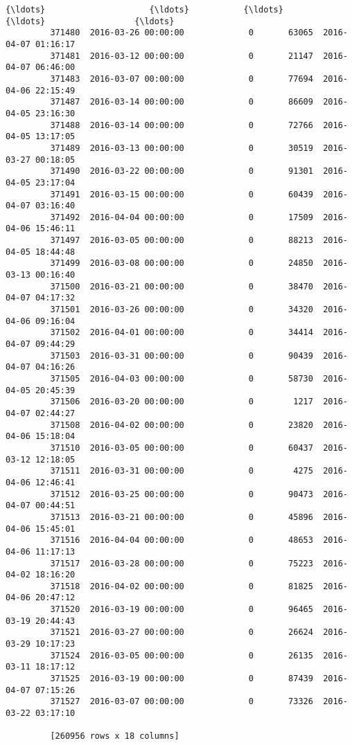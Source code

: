 \documentclass[11pt]{article}
\begin{document}
\begin{Verbatim}[commandchars=\\\{\}]
         {\ldots}                     {\ldots}           {\ldots}         {\ldots}                  {\ldots}  
         371480  2016-03-26 00:00:00             0       63065  2016-04-07 01:16:17  
         371481  2016-03-12 00:00:00             0       21147  2016-04-07 06:46:00  
         371483  2016-03-07 00:00:00             0       77694  2016-04-06 22:15:49  
         371487  2016-03-14 00:00:00             0       86609  2016-04-05 23:16:30  
         371488  2016-03-14 00:00:00             0       72766  2016-04-05 13:17:05  
         371489  2016-03-13 00:00:00             0       30519  2016-03-27 00:18:05  
         371490  2016-03-22 00:00:00             0       91301  2016-04-05 23:17:04  
         371491  2016-03-15 00:00:00             0       60439  2016-04-07 03:16:40  
         371492  2016-04-04 00:00:00             0       17509  2016-04-06 15:46:11  
         371497  2016-03-05 00:00:00             0       88213  2016-04-05 18:44:48  
         371499  2016-03-08 00:00:00             0       24850  2016-03-13 00:16:40  
         371500  2016-03-21 00:00:00             0       38470  2016-04-07 04:17:32  
         371501  2016-03-26 00:00:00             0       34320  2016-04-06 09:16:04  
         371502  2016-04-01 00:00:00             0       34414  2016-04-07 09:44:29  
         371503  2016-03-31 00:00:00             0       90439  2016-04-07 04:16:26  
         371505  2016-04-03 00:00:00             0       58730  2016-04-05 20:45:39  
         371506  2016-03-20 00:00:00             0        1217  2016-04-07 02:44:27  
         371508  2016-04-02 00:00:00             0       23820  2016-04-06 15:18:04  
         371510  2016-03-05 00:00:00             0       60437  2016-03-12 12:18:05  
         371511  2016-03-31 00:00:00             0        4275  2016-04-06 12:46:41  
         371512  2016-03-25 00:00:00             0       90473  2016-04-07 00:44:51  
         371513  2016-03-21 00:00:00             0       45896  2016-04-06 15:45:01  
         371516  2016-04-04 00:00:00             0       48653  2016-04-06 11:17:13  
         371517  2016-03-28 00:00:00             0       75223  2016-04-02 18:16:20  
         371518  2016-04-02 00:00:00             0       81825  2016-04-06 20:47:12  
         371520  2016-03-19 00:00:00             0       96465  2016-03-19 20:44:43  
         371521  2016-03-27 00:00:00             0       26624  2016-03-29 10:17:23  
         371524  2016-03-05 00:00:00             0       26135  2016-03-11 18:17:12  
         371525  2016-03-19 00:00:00             0       87439  2016-04-07 07:15:26  
         371527  2016-03-07 00:00:00             0       73326  2016-03-22 03:17:10  
         
         [260956 rows x 18 columns]
\end{Verbatim}
            
\end{document}
